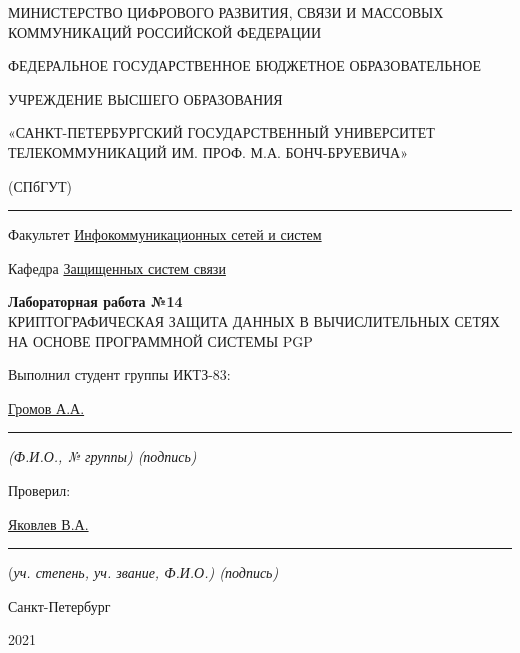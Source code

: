 \documentclass[a4paper,14pt]{extarticle}
\begin{document}
    \begin{center}
        \thispagestyle{empty}
        \begin{singlespace}
        МИНИСТЕРСТВО ЦИФРОВОГО РАЗВИТИЯ, СВЯЗИ И МАССОВЫХ КОММУНИКАЦИЙ РОССИЙСКОЙ ФЕДЕРАЦИИ

        ФЕДЕРАЛЬНОЕ ГОСУДАРСТВЕННОЕ БЮДЖЕТНОЕ ОБРАЗОВАТЕЛЬНОЕ

        УЧРЕЖДЕНИЕ ВЫСШЕГО ОБРАЗОВАНИЯ

        «САНКТ-ПЕТЕРБУРГСКИЙ ГОСУДАРСТВЕННЫЙ УНИВЕРСИТЕТ ТЕЛЕКОММУНИКАЦИЙ ИМ. ПРОФ. М.А. БОНЧ-БРУЕВИЧА»

        (СПбГУТ)
        \end{singlespace}
        \vspace{-1ex}
        \rule{\textwidth}{0.4pt}
        \vspace{-5ex}

        Факультет \underline{Инфокоммуникационных сетей и систем}

        Кафедра \underline{Защищенных систем связи}
        \vspace{10ex}

        \textbf{Лабораторная работа №14}\\
        КРИПТОГРАФИЧЕСКАЯ ЗАЩИТА ДАННЫХ В ВЫЧИСЛИТЕЛЬНЫХ СЕТЯХ НА ОСНОВЕ ПРОГРАММНОЙ СИСТЕМЫ PGP


    \end{center}
    \vspace{4ex}
    \begin{flushright}
    \parbox{10 cm}{
    \begin{flushleft}
        Выполнил студент группы ИКТЗ-83:

        \underline{Громов А.А. } \hfill \rule[-0.85ex]{0.1\textwidth}{0.6pt}

        \footnotesize \textit{ (Ф.И.О., № группы) \hfill (подпись)} \normalsize

        Проверил:

        \underline{Яковлев В.А.} \hfill \rule[-0.85ex]{0.1\textwidth}{0.6pt}

        (\footnotesize \textit{уч. степень, уч. звание, Ф.И.О.) \hfill (подпись)} \normalsize

    \end{flushleft}
    }
    \end{flushright}
    \begin{center}
        \vfill
        Санкт-Петербург

        2021

    \end{center}
    \newpage
\end{document}
